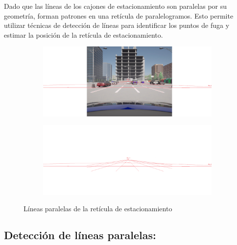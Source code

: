 \noindent
Dado que las líneas de los cajones de estacionamiento son paralelas por su geometría, forman patrones en una retícula de paralelogramos.
Esto permite utilizar técnicas de detección de líneas para identificar los puntos de fuga y estimar la posición de la retícula de estacionamiento.

\begin{figure}[!ht]
    \centering
    \begin{subfigure}{0.8\textwidth}
        \includegraphics[width=\textwidth]{img/reticule/pov_reticule}\label {fig:pov_reticule}
    \end{subfigure}
    \begin{subfigure}{0.8\textwidth}
        \includegraphics[width=\textwidth]{img/reticule/pov_reticule_layer}\label {fig:pov_reticule_layers}
    \end{subfigure}
    \caption{Líneas paralelas de la retícula de estacionamiento}
    \label{fig:reticule_pov}
\end{figure}

\noindent

\subsection{Detección de líneas paralelas:}

